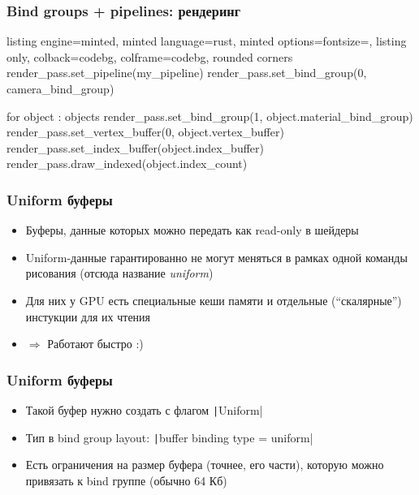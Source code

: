\documentclass[10pt]{beamer}
\begin{document}
\begin{frame}[fragile]
\frametitle{Bind groups + pipelines: рендеринг}
\begin{tcblisting}{listing engine=minted, minted language=rust, minted options={fontsize=\scriptsize}, listing only, colback=codebg, colframe=codebg, rounded corners}
render_pass.set_pipeline(my_pipeline)
render_pass.set_bind_group(0, camera_bind_group)

for object : objects {
  render_pass.set_bind_group(1, object.material_bind_group)
  render_pass.set_vertex_buffer(0, object.vertex_buffer)
  render_pass.set_index_buffer(object.index_buffer)
  render_pass.draw_indexed(object.index_count)
}
\end{tcblisting}
\end{frame}

\begin{frame}[fragile]
\frametitle{Uniform буферы}
\begin{itemize}
\item Буферы, данные которых можно передать как read-only в шейдеры
\pause
\item Uniform-данные гарантированно не могут меняться в рамках одной команды рисования (отсюда название \textit{uniform})
\pause
\item Для них у GPU есть специальные кеши памяти и отдельные (``скалярные'') инстукции для их чтения
\pause
\item \(\Longrightarrow\) Работают быстро :)
\end{itemize}
\end{frame}

\begin{frame}[fragile]
\frametitle{Uniform буферы}
\begin{itemize}
\item Такой буфер нужно создать с флагом \texttt|Uniform|
\pause
\item Тип в bind group layout: \texttt|buffer binding type = uniform|
\pause
\item Есть ограничения на размер буфера (точнее, его части), которую можно привязать к bind группе (обычно 64 Кб)
\end{itemize}
\end{frame}
\end{document}
